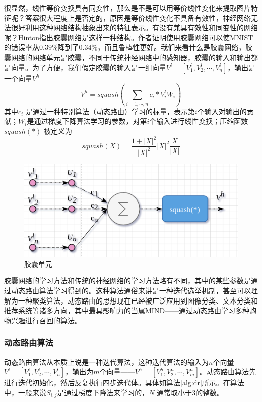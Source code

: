 \documentclass[twoside,a4paper,12pt]{book}%
\begin{document}
很显然，线性等价变换具有同变性，那么是不是可以用等价线性变化来提取图片特征呢？答案很大程度上是否定的，原因是等价线性变化不具备有效性，神经网络无法很好利用这种网络结构抽象出来的特征表示。有没有兼具有效性和同变性的网络呢？Hinton指出胶囊网络是这样一种结构。作者证明使用胶囊网络可以使MNIST的错误率从$0.39\%$降到了$0.34\%$，而且鲁棒性更好。我们来看什么是胶囊网络，胶囊网络的网络单元是胶囊，不同于传统神经网络中的感知器，胶囊的输入和输出都是向量。为了方便，我们假定胶囊的输入是一组向量$V^l=[V^l_1,V^l_2,\cdots, V^l_n]$，输出是一个向量$V^h$
$$
V^h=squash(\sum_{i=1,\cdots ,n}{c_i*V^l_iW_i})
$$
其中$c_i$ 是通过一种特别算法（动态路由）学习的标量，表示第$i$个输入对输出的贡献；$W_i$是通过梯度下降算法学习的参数，对第$i$个输入进行线性变换；压缩函数$squash(*)$ 被定义为
$$squash(X)=\frac{1+|X|^2}{|X|^2}{|X|^2}\frac{X}{|X|}$$
\begin{figure}[ht]
\begin{center}
\includegraphics[width=5.0in]{figures/capsule.png}
\caption{胶囊单元}
\label{fig:capsule}
\end{center}
\end{figure}
胶囊网络的学习方法和传统的神经网络的学习方法略有不同，其中的某些参数是通过动态路由算法学习得到的。这种算法通俗来讲是一种迭代选举机制，甚至可以理解为一种聚类算法，动态路由的思想现在已经被广泛应用到图像分类、文本分类和推荐系统等诸多方向，其中最具影响力的当属MIND——通过动态路由学习多种购物兴趣进行召回的算法。
\subsubsection{动态路由算法}
动态路由算法从本质上说是一种迭代算法，这种迭代算法的输入为$n$个向量——$V^l=[V^l_1,V^l_2,\cdots, V^l_n]$，输出为$m$个向量——$V^h=[V^h_1,V^h_2,\cdots, V^h_m]$。动态路由算法先进行迭代初始化，然后反复执行四步迭代体。具体如算法\ref{alg:dr}所示。在算法中，一般来说$S_{i,j}$是通过梯度下降法来学习的，$N$ 通常取小于$3$的整数。
\end{document}
